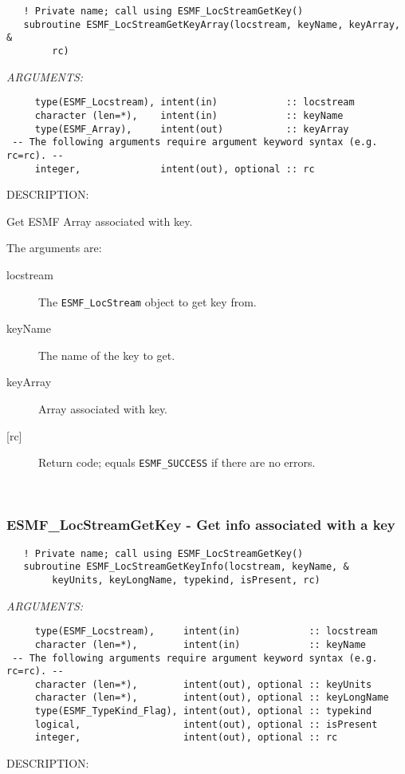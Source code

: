  
\begin{verbatim}   ! Private name; call using ESMF_LocStreamGetKey()
   subroutine ESMF_LocStreamGetKeyArray(locstream, keyName, keyArray, &
        rc)\end{verbatim}{\em ARGUMENTS:}
\begin{verbatim}     type(ESMF_Locstream), intent(in)            :: locstream
     character (len=*),    intent(in)            :: keyName
     type(ESMF_Array),     intent(out)           :: keyArray
 -- The following arguments require argument keyword syntax (e.g. rc=rc). --
     integer,              intent(out), optional :: rc\end{verbatim}
{\sf DESCRIPTION:\\ }


   Get ESMF Array associated with key.
  
   The arguments are:
   \begin{description}
   \item [locstream]
   The {\tt ESMF\_LocStream} object to get key from.
   \item [keyName]
   The name of the key to get. 
   \item [keyArray]
   Array associated with key.
   \item [{[rc]}]
   Return code; equals {\tt ESMF\_SUCCESS} if there are no errors.
   \end{description} 
 
\mbox{}\hrulefill\ 
 
\subsubsection [ESMF\_LocStreamGetKey] {ESMF\_LocStreamGetKey - Get info associated with a key}


 
\begin{verbatim}   ! Private name; call using ESMF_LocStreamGetKey()
   subroutine ESMF_LocStreamGetKeyInfo(locstream, keyName, &
        keyUnits, keyLongName, typekind, isPresent, rc)\end{verbatim}{\em ARGUMENTS:}
\begin{verbatim}     type(ESMF_Locstream),     intent(in)            :: locstream
     character (len=*),        intent(in)            :: keyName
 -- The following arguments require argument keyword syntax (e.g. rc=rc). --
     character (len=*),        intent(out), optional :: keyUnits 
     character (len=*),        intent(out), optional :: keyLongName 
     type(ESMF_TypeKind_Flag), intent(out), optional :: typekind
     logical,                  intent(out), optional :: isPresent
     integer,                  intent(out), optional :: rc\end{verbatim}
{\sf DESCRIPTION:\\ }


